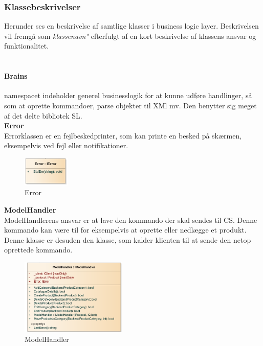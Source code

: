 \subsubsection{Klassebeskrivelser}

Herunder ses en  beskrivelse af samtlige klasser i business logic layer. Beskrivelsen vil fremgå som \textit{klassenavn"} efterfulgt af en kort beskrivelse af klassens ansvar og funktionalitet.\\\\

\paragraph{Brains} namespacet indeholder generel businesslogik for at kunne udføre handlinger, så som at oprette kommandoer, parse objekter til XMl mv. Den benytter sig meget af det delte bibliotek \gls{SL}.\\


\textbf{Error}\\
Errorklassen er en fejlbeskedprinter, som kan printe en besked på skærmen, eksempelvis ved fejl eller notifikationer.
\begin{center}
\begin{figure}[!h]
    \centering
    \includegraphics[width=0.2\textwidth]{Systemdesign/backend/klassebeskrivelser/Images/Error.png}
    \caption{Error}
    \label{fig:modelhandler}
\end{figure}
\end{center}
 \bigskip 
 
 
 
 
 
 
 


\textbf{ModelHandler}\\
ModelHandlerens ansvar er at lave den kommando der skal sendes til \gls{CS}. Denne kommando kan være til for eksempelvis at oprette eller nedlægge et produkt. Denne klasse er desuden den klasse, som kalder klienten til at sende den netop oprettede kommando. 
\begin{center}
\begin{figure}[!h]
    \centering
    \includegraphics[width=0.45\textwidth]{Systemdesign/backend/klassebeskrivelser/Images/ModelHandler.png}
    \caption{ModelHandler}
    \label{fig:modelhandler}
\end{figure}
\end{center}
\label{Modelhandler_Beskrivelse}
 \bigskip
 
